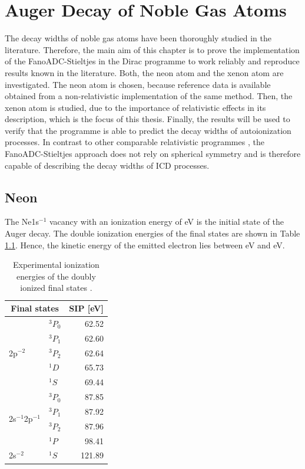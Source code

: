 \chapter{Auger Decay of Noble Gas Atoms}
\label{chapter:res_auger}
The decay widths of noble gas atoms have been thoroughly studied in the
literature. Therefore, the main aim of this chapter is to prove the implementation
of the FanoADC-Stieltjes in the Dirac programme \cite{DIRAC13} to work
reliably and reproduce results known in the literature. Both, the neon atom
and the xenon atom are investigated.
The neon atom is chosen, because reference data is available
obtained from a non-relativistic
implementation of the same method. Then, the xenon atom is studied, due
to the importance of relativistic effects in its description, which is
the focus of this thesis.
Finally, the results will be used to verify that the programme is
able to predict the decay widths of autoionization processes.
In contrast to other comparable relativistic programmes
\cite{Tulkki92,Fritzsche12}, the FanoADC-Stieltjes approach does not
rely on spherical symmetry and is therefore capable of describing
the decay widths of \ac{ICD} processes.


\section{Neon}

The Ne1s$^{-1}$ vacancy with an ionization energy of \unit[870]{eV}
\cite{Saethre84} is
the initial state of the Auger decay. The double ionization energies of
the final states are shown in Table \ref{table:Ne_dips}. Hence, the
kinetic energy of the emitted electron lies between
\unit[748]{eV} and \unit[808]{eV}.

\begin{table}[h]
  \centering
  \caption{Experimental ionization energies of the doubly ionized final states
           \cite{NIST2014}.}
  \begin{tabular}{llr}
   \toprule
   \multicolumn{2}{c}{Final states} & \acs{SIP} [eV]\\
   \midrule
   \multirow{5}{*}{2p$^{-2}$} & $^3P_0$        & 62.52 \\
                              & $^3P_1$        & 62.60 \\
                              & $^3P_2$        & 62.64 \\
                              & $^1D$          & 65.73 \\
                              & $^1S$          & 69.44 \\
   \midrule
 \multirow{4}{*}{2s$^{-1}$2p$^{-1}$} & $^3P_0$ & 87.85 \\
                              & $^3P_1$        & 87.92 \\
                              & $^3P_2$        & 87.96 \\
                              & $^1P$          & 98.41 \\
   \midrule                                    
      2s$^{-2}$               & $^1S$          &121.89 \\
   \bottomrule
  \end{tabular}
  \label{table:Ne_dips}
\end{table}

